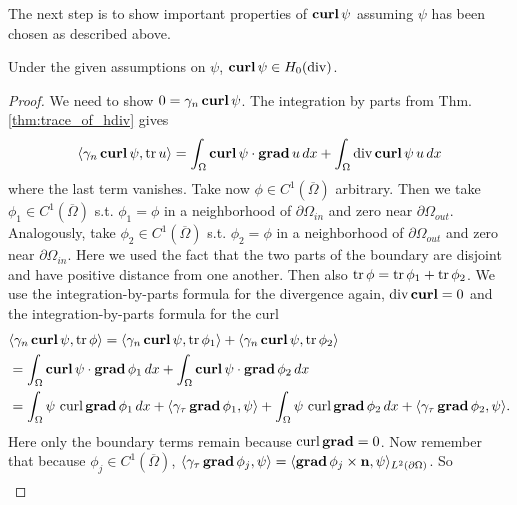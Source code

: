 \documentclass[../master_thesis.tex]{subfiles}
\begin{document}
The next step is to show important properties of $\veccurl \psi$ 
assuming $\psi$ has been chosen as described above.
\begin{proposition}\label{prop:psi_zero_normal_trace}
    Under the given assumptions on $\psi$, $\veccurl\psi \in H_0(\diver)$.
\end{proposition}
\begin{proof}
    We need to show $0 = \gamma_n \veccurl \psi$. The integration by parts from Thm.\,\ref{thm:trace_of_hdiv} gives
    \begin{align*}
        \langle \gamma_n \veccurl \psi , \tr u \rangle 
        = \int_\Omega \veccurl \psi \cdot \bm{\grad} u \, dx 
            + \int_\Omega \diver \veccurl \psi \, u \, dx 
    \end{align*}
    where the last term vanishes. Take now $\phi \in C^1(\overline{\Omega})$ 
    arbitrary. Then we take $\phi_1 \in C^1(\overline{\Omega})$ s.t. $\phi_1 = \phi$ in 
    a neighborhood of $\partial \Omega_{in}$ and zero near $\partial \Omega_{out}$. 
    Analogously, take $\phi_2 \in C^1(\overline{\Omega})$ s.t. $\phi_2 = \phi$ in 
    a neighborhood of $\partial \Omega_{out}$ and zero near $\partial \Omega_{in}$. Here we used the fact that 
    the two parts of the boundary are disjoint and have positive distance from one another.
    Then also $\tr \phi = \tr \phi_1 + \tr \phi_2$.
    We use the integration-by-parts formula for the divergence again, $\diver \veccurl = 0$ and the 
    integration-by-parts formula for the curl
    \begin{align*}
        &\langle \gamma_n \veccurl \psi , \tr \phi \rangle 
        = \langle \gamma_n \veccurl \psi , \tr \phi_1 \rangle + \langle \gamma_n \veccurl \psi , \tr \phi_2 \rangle
        \\ &= \int_\Omega \veccurl \psi \cdot \bm{\grad} \phi_1 \, dx + \int_\Omega \veccurl \psi \cdot \bm{\grad} \phi_2 \, dx
        \\ &= \int_\Omega \psi \, \curl \bm{\grad} \phi_1 \, dx + \langle \gamma_\tau \bm{\grad} \phi_1, \psi \rangle
            + \int_\Omega \psi \, \curl \bm{\grad} \phi_2 \, dx + \langle \gamma_\tau \bm{\grad} \phi_2, \psi \rangle.
    \end{align*}
    Here only the boundary terms remain because $\curl \bm{\grad} =0$.
    Now remember that because $\phi_j \in C^1(\overline{\Omega})$, 
    $\langle \gamma_\tau \bm{\grad} \phi_j, \psi \rangle 
    = \langle \bm{\grad} \phi_j \times \mathbf{n}, \psi \rangle_{L^2(\partial \Omega)}$. So 
    \begin{align*}

\end{align*}
\end{proof}
\end{document}
